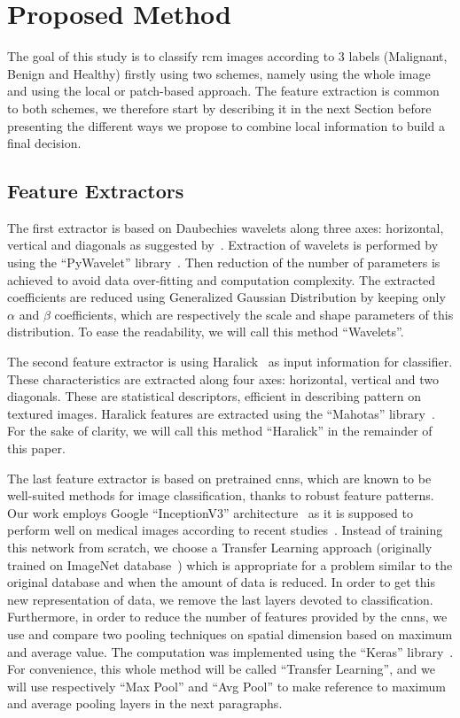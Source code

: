 \section{Proposed Method}
\label{methods}
The goal of this study is to classify \ac{rcm} images according to 3 labels (Malignant, Benign and Healthy) firstly using two schemes, namely using the whole image and using the local or patch-based approach. The feature extraction is common to both schemes, we therefore start by describing it in the next Section before presenting the different ways we propose to combine local information to build a final decision.\par

\subsection{Feature Extractors}
\label{descriptors}
The first extractor is based on Daubechies wavelets along three axes: horizontal, vertical and diagonals as suggested by~\cite{Halimi2017a}. Extraction of wavelets is performed by using the “PyWavelet” library~\cite{lee2006pywavelets}. Then reduction of the number of parameters is achieved to avoid data over-fitting and computation complexity. The extracted coefficients are reduced using Generalized Gaussian Distribution by keeping only $\alpha$ and $\beta$ coefficients, which are respectively the scale and shape parameters of this distribution. To ease the readability, we will call this method “Wavelets”.\par
The second feature extractor is using Haralick~\cite{Haralick1973} as input information for classifier. These characteristics are extracted along four axes: horizontal, vertical and two diagonals. These are statistical descriptors, efficient in describing pattern on textured images. Haralick features are extracted using the “Mahotas” library~\cite{coelho2012mahotas}. For the sake of clarity, we will call this method “Haralick” in the remainder of this paper.\par
The last feature extractor is based on pretrained \acsp{cnn}, which are known to be well-suited methods for image classification, thanks to robust feature patterns. Our work employs Google “InceptionV3” architecture~\cite{Szegedy2015} as it is supposed to perform well on medical images according to recent studies~\cite{Litjens2017}. Instead of training this network from scratch, we choose a Transfer Learning approach (originally trained on ImageNet database~\cite{Deng2008}) which is appropriate for a problem similar to the original database and when the amount of data is reduced. In order to get this new representation of data, we remove the last layers devoted to classification. Furthermore, in order to reduce the number of features provided by the \acsp{cnn}, we use and compare two pooling techniques on spatial dimension based on maximum and average value. The computation was implemented using the “Keras” library~\cite{chollet2015keras}. For convenience, this whole method will be called “Transfer Learning”, and we will use respectively “Max Pool” and “Avg Pool” to make reference to maximum and average pooling layers in the next paragraphs.\par
